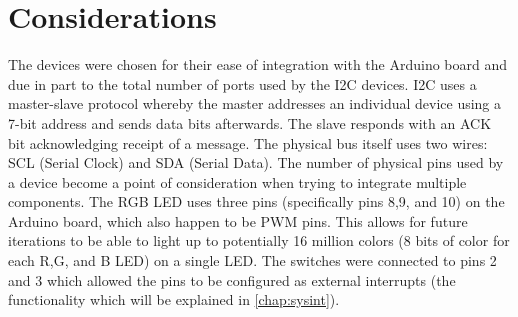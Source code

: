 \section{Considerations}

The devices were chosen for their ease of integration with the Arduino board and due in part to the total number of ports used by the I2C devices.  I2C uses a master-slave protocol whereby the master addresses an individual device using a 7-bit address and sends data bits afterwards.  The slave responds with an ACK bit acknowledging receipt of a message.  The physical bus itself uses two wires: SCL (Serial Clock) and SDA (Serial Data).  The number of physical pins used by a device become a point of consideration when trying to integrate multiple components.  The RGB LED uses three pins (specifically pins 8,9, and 10) on the Arduino board, which also happen to be PWM pins.  This allows for future iterations to be able to light up to potentially 16 million colors (8 bits of color for each R,G, and B LED) on a single LED.  The switches were connected to pins 2 and 3 which allowed the pins to be configured as external interrupts (the functionality which will be explained in \autoref{chap:sysint}).